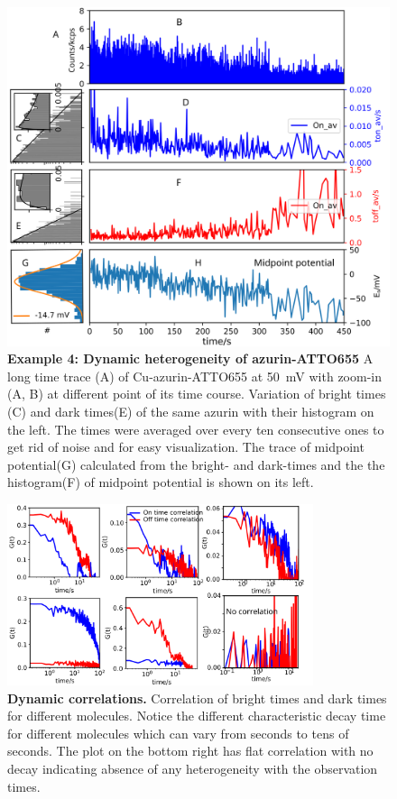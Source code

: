 \begin{figure}[ht]
  \centering
  \includegraphics[width=\textwidth]{dynamic_Point_21_75mV_S105}
  \makeatletter
  \renewcommand{\fnum@figure}{\figurename~S\thefigure}
  \makeatother
  \caption{\textbf{Example 4: Dynamic heterogeneity of azurin-ATTO655}
  A long time trace (A) of Cu-azurin-ATTO655 at \SI{50}{\mV} with zoom-in (A, B) at different point of its time course.
  Variation of bright times (C) and dark times(E) of the same azurin with their histogram on the left.
  The times were averaged over every ten consecutive ones to get rid of noise and for easy visualization.
  The trace of midpoint potential(G) calculated from the bright- and dark-times and the the histogram(F) of midpoint potential is shown on its left.
  }
  \label{SIfig:dynamic_Point_21_75mV_S105}
\end{figure}

\begin{figure}[ht]
  \centering
  \includegraphics[width=0.8\textwidth]{Dynamic_corr_many}
  \makeatletter
  \renewcommand{\fnum@figure}{\figurename~S\thefigure}
  \makeatother
  \caption{\textbf{Dynamic correlations.}
  Correlation of bright times and dark times for different molecules.
  Notice the different characteristic decay time for different molecules which can vary from seconds to tens of seconds.
  The plot on the bottom right has flat correlation with no decay indicating absence of any heterogeneity with the observation times.  
  }
  \label{SIfig:Dynamic_corr_many}
\end{figure}

